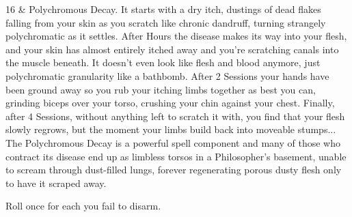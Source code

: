 {{    16 &  Polychromous Decay. It starts with a dry itch, dustings of dead flakes falling from your skin as you scratch like chronic dandruff, turning strangely polychromatic as it settles. After Hours the disease makes its way into your flesh, and your skin has almost entirely itched away and you're scratching canals into the muscle beneath. It doesn't even look like flesh and blood anymore, just polychromatic granularity like a bathbomb.  After 2 Sessions your hands have been ground away so you rub your itching limbs together as best you can, grinding biceps over your torso, crushing your chin against your chest.  Finally, after 4 Sessions, without anything left to scratch it with, you find that your flesh slowly regrows, but the moment your limbs build back into moveable stumps... The Polychromous Decay is a powerful spell component and many of those who contract its disease end up as limbless torsos in a Philosopher's basement, unable to scream through dust-filled lungs, forever regenerating porous dusty flesh only to have it scraped away.  \\

}


\newpage



Roll once for each  you fail to disarm.  



}
